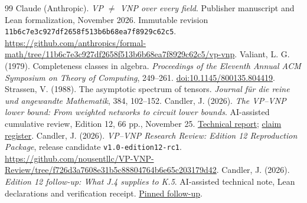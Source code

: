 \documentclass[11pt,letterpaper]{article}
\theoremstyle{definition}\newtheorem{definition}[theorem]{Definition}\newtheorem{example}[theorem]{Example}
\theoremstyle{remark}\newtheorem{remark}[theorem]{Remark}
\newcommand{\aud}[2]{\href{https://github.com/nousentllc/VP-VNP-Review/blob/567303d0bcf4f9d54390437b137752446e58ccd6/#1}{#2}}
\newcommand{\follow}[2]{\href{https://github.com/nousentllc/VP-VNP-Review/blob/8a7976933b6b2b4ffda1ad3a0dfb5fc6b6f023e8/#1}{#2}}
\begin{document}
\begin{thebibliography}{99}
 Claude (Anthropic). \emph{VP $\ne$ VNP over every field}. Publisher manuscript and Lean formalization, November 2026. Immutable revision \nolinkurl{11b6c7e3c927df2658f513b6b68ea7f8929c62c5}. \url{https://github.com/anthropics/formal-math/tree/11b6c7e3c927df2658f513b6b68ea7f8929c62c5/vp-vnp}.
 Valiant, L. G. (1979). Completeness classes in algebra. \emph{Proceedings of the Eleventh Annual ACM Symposium on Theory of Computing}, 249--261. \href{https://doi.org/10.1145/800135.804419}{doi:10.1145/800135.804419}.
 Strassen, V. (1988). The asymptotic spectrum of tensors. \emph{Journal f\"ur die reine und angewandte Mathematik}, 384, 102--152.
 Candler, J. (2026). \emph{The VP--VNP lower bound: From weighted networks to circuit lower bounds}. AI-assisted cumulative review, Edition 12, 66 pp., November 25. \aud{report/VP_VNP_Research_Review.pdf}{Technical report}; \aud{report/proof-coverage.csv}{claim register}.
 Candler, J. (2026). \emph{VP--VNP Research Review: Edition 12 Reproduction Package}, release candidate \texttt{v1.0-edition12-rc1}. \url{https://github.com/nousentllc/VP-VNP-Review/tree/f726d3a7608e31b5c88804764b6e65c203179d42}.
 Candler, J. (2026). \emph{Edition 12 follow-up: What J.4 supplies to K.5}. AI-assisted technical note, Lean declarations and verification receipt. \follow{followups/j4/README.md}{Pinned follow-up}.


\end{thebibliography}
\end{document}
